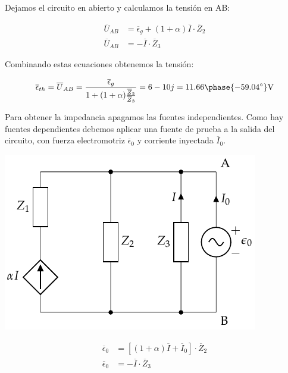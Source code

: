 Dejamos el circuito en abierto y calculamos la tensión en AB:

\begin{align*}
  \overline{U}_{AB} &= \overline{\epsilon}_g + (1 + \alpha) \overline{I} \cdot \overline{Z}_2\\
  \overline{U}_{AB} &= - \overline{I} \cdot \overline{Z}_3
\end{align*}

Combinando estas ecuaciones obtenemos la tensión:

\begin{equation*}
  \overline{\epsilon}_{th} = \overline{U}_{AB} = \frac{\overline{\epsilon}_g}{1 + (1 + \alpha) \frac{\overline{Z}_2}{\overline{Z}_3}} = 6 - 10j = 11.66\phase{\ang{-59.04}}\si{\volt}
\end{equation*}

Para obtener la impedancia apagamos las fuentes independientes. Como hay fuentes dependientes debemos aplicar una fuente de prueba a la salida del circuito, con fuerza electromotriz $\overline{\epsilon}_0$ y corriente inyectada $\overline{I}_0$.

\begin{minipage}{0.5\linewidth}
  \begin{center}
    \includegraphics{figuras/Thevenin4_fuenteprueba}
  \end{center}
\end{minipage}
\begin{minipage}{0.5\linewidth}
  \begin{align*}
    \overline{\epsilon}_0 &= [(1 + \alpha) \overline{I} + \overline{I}_0] \cdot \overline{Z}_2\\
    \overline{\epsilon}_0 &= - \overline{I}\cdot \overline{Z}_3
  \end{align*}
\end{minipage}

